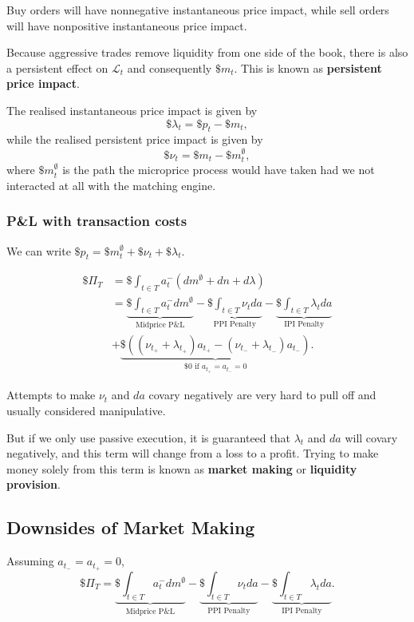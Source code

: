 \documentclass{article}
\begin{document}
Buy orders will have nonnegative instantaneous price impact, while sell orders will have nonpositive instantaneous price impact.

Because aggressive trades remove liquidity from one side of the book, there is also a persistent effect on $\mathcal{L}_t$ and consequently $\$m_t$. This is known as \textbf{persistent price impact}.

The realised instantaneous price impact is given by
$$\$\lambda_t = \$p_t - \$m_t,$$
while the realised persistent price impact is given by
$$\$\nu_t = \$m_t - \$m_t^\emptyset,$$
where $\$m_t^\emptyset$ is the path the microprice process would have taken had we not interacted at all with the matching engine.

\subsubsection{P\&L with transaction costs}
We can write $\$p_t = \$m_t^\emptyset + \$\nu_t + \$\lambda_t.$

\begin{align*}
	\$\Pi_T	&= \$\int_{t\in T} a_t^- (dm^\emptyset+dn+d\lambda)
\\		&= \underbrace{\$\int_{t\in T} a_t^- dm^\emptyset}_{\textrm{Midprice P\&L}} - \underbrace{\$\int_{t\in T} \nu_t da}_{\textrm{PPI Penalty}} - \underbrace{\$\int_{t\in T} \lambda_t da}_{\textrm{IPI Penalty}}
\\		& + \underbrace{\$((\nu_{t_+} + \lambda_{t_+})a_{t_+} - (\nu_{t_-} + \lambda_{t_-})a_{t_-})}_{\$0\textrm{ if }a_{t_+}=a_{t_-}=0}.
\end{align*}

Attempts to make $\nu_t$ and $da$ covary negatively are very hard to pull off and usually considered manipulative.%

But if we only use passive execution, it is guaranteed that $\lambda_t$ and $da$ will covary negatively, and this term will change from a loss to a profit. Trying to make money solely from this term is known as \textbf{market making} or \textbf{liquidity provision}.

\subsection{Downsides of Market Making}
Assuming $a_{t_-}=a_{t_+}=0$,
$$\$\Pi_T = \underbrace{\$\int_{t\in T} a_t^- dm^\emptyset}_{\textrm{Midprice P\&L}} - \underbrace{\$\int_{t\in T} \nu_t da}_{\textrm{PPI Penalty}} - \underbrace{\$\int_{t\in T} \lambda_t da}_{\textrm{IPI Penalty}}.$$
\end{document}
